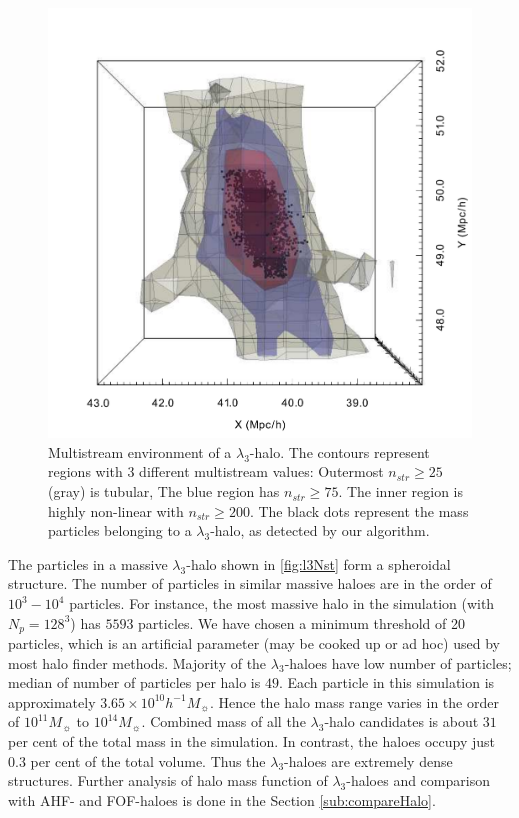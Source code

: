 \documentclass[fleqn,usenatbib,useAMS]{mnras}
\begin{document}
\begin{figure}
\begin{minipage}[t]{.99\linewidth}
  \centering\includegraphics[width=7.cm]{fig9.pdf} 
\end{minipage}\hfill
\caption{Multistream environment of a $\lambda_3$-halo. The contours represent regions with 3 different multistream values: Outermost $n_{str} \geq 25$ (gray) is tubular, The blue region has $n_{str} \geq 75$. The inner region is highly non-linear with $n_{str} \geq 200$.  The black dots represent the mass particles belonging to a $\lambda_3$-halo, as detected by our algorithm.}
\label{fig:l3Nst}
\end{figure}



The particles in a massive $\lambda_3$-halo shown in \autoref{fig:l3Nst} form a spheroidal structure. The number of particles in similar massive haloes are in the order of $10^3 - 10^4$ particles. For instance, the most massive halo in the simulation (with $N_p = 128^3$) has $5593$ particles. We have chosen a minimum threshold of 20 particles, which is an artificial parameter (may be cooked up or ad hoc) used by most halo finder methods. Majority of the $\lambda_3$-haloes have low number of particles; median of number of particles per halo is $49$. Each particle in this simulation is approximately $ 3.65 \times 10^{10} h^{-1} M_{\sun}$. Hence the halo mass range varies in the order of $10^{11} M_{\sun}$ to $10^{14} M_{\sun}$. Combined mass of all the $\lambda_3$-halo candidates is about $31$ per cent of the total mass in the simulation. In contrast, the haloes occupy just $0.3$ per cent of the total volume. Thus the $\lambda_3$-haloes are extremely dense structures. Further analysis of halo mass function of $\lambda_3$-haloes and comparison with AHF- and FOF-haloes is done in the Section \ref{sub:compareHalo}.  
\end{document}
